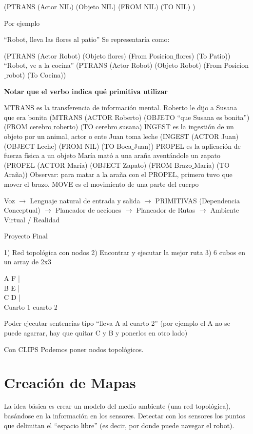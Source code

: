 \hspace{1cm}
(PTRANS (Actor NIL) (Objeto NIL) (FROM NIL) (TO NIL) )

Por ejemplo

“Robot, lleva las flores al patio”
Se representaría como:

(PTRANS (Actor Robot) (Objeto flores) (From Posicion$\_$flores) (To Patio))
“Robot, ve a la cocina”
(PTRANS (Actor Robot) (Objeto Robot) (From Posicion$\_$robot) (To Cocina))

\textbf{Notar que el verbo indica qué primitiva utilizar}

MTRANS es la transferencia de información mental.
Roberto le dijo a Susana que era bonita
(MTRANS (ACTOR Roberto) (OBJETO “que Susana es bonita”) (FROM cerebro$\_$roberto) (TO
cerebro$\_$susana)
INGEST es la ingestión de un objeto por un animal, actor o ente
Juan toma leche
(INGEST (ACTOR Juan) (OBJECT Leche) (FROM NIL) (TO Boca$\_$Juan))
PROPEL es la aplicación de fuerza física a un objeto
María mató a una araña aventándole un zapato
(PROPEL (ACTOR María) (OBJECT Zapato) (FROM Brazo$\_$Maria) (TO Araña))
Observar: para matar a la araña con el PROPEL, primero tuvo que mover el brazo.
MOVE es el movimiento de una parte del cuerpo



Voz $\rightarrow$ Lenguaje natural de entrada y salida $\rightarrow$ PRIMITIVAS (Dependencia Conceptual) $\rightarrow$ Planeador de
acciones $\rightarrow$ Planeador de Rutas $\rightarrow$ Ambiente Virtual / Realidad



Proyecto Final

1) Red topológica con nodos
2) Encontrar y ejecutar la mejor ruta
3) 6 cubos en un array de 2x3

A F | \\
B E | \\
C D | \\
Cuarto 1  cuarto 2 

Poder ejecutar sentencias tipo “lleva A al cuarto 2”
(por ejemplo el A no se puede agarrar, hay que quitar C y B y ponerlos en otro lado)

Con CLIPS
Podemos poner nodos topológicos.


\section{Creación de Mapas}

La idea básica es crear un modelo del medio ambiente (una red topológica), basándose en la información en
los sensores.
Detectar con los sensores los puntos que delimitan el “espacio libre” (es decir, por donde puede navegar el
robot).

